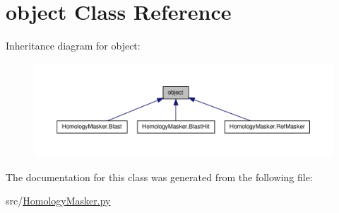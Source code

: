 \hypertarget{classobject}{\section{object Class Reference}
\label{classobject}
}


Inheritance diagram for object\-:
\nopagebreak
\begin{figure}[H]
\begin{center}
\leavevmode
\includegraphics[width=350pt]{classobject__inherit__graph}
\end{center}
\end{figure}


The documentation for this class was generated from the following file\-:\begin{DoxyCompactItemize}
\item 
src/\hyperlink{HomologyMasker_8py}{Homology\-Masker.\-py}\end{DoxyCompactItemize}

